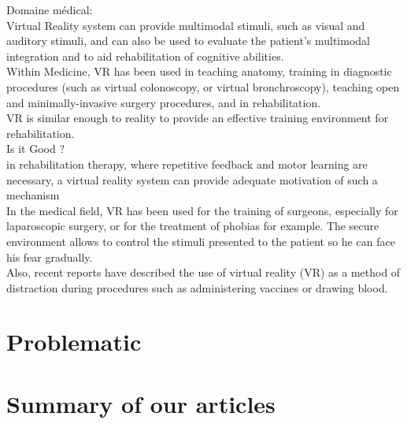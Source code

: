 \documentclass{article}
\begin{document}
Domaine médical: \\
Virtual Reality system can provide multimodal stimuli, such as visual and auditory stimuli, and can also be used to evaluate the patient’s multimodal integration and to aid rehabilitation of cognitive abilities. \\
Within Medicine, VR has been used in teaching anatomy, training in diagnostic procedures (such as virtual colonoscopy, or virtual bronchroscopy), teaching open and minimally-invasive surgery procedures, and in rehabilitation. \\

VR is similar enough to reality to provide an effective training environment for rehabilitation. \\


Is it Good ? \\
in rehabilitation therapy, where repetitive feedback and motor learning are necessary, a virtual reality system can provide adequate motivation of such a mechanism \\
In the medical field, VR has been used for the training of surgeons, especially for laparoscopic surgery, or for the treatment of phobias for example. The secure environment allows to control the stimuli presented to the patient so he can face his fear gradually. \\
Also, recent reports have described the use of virtual reality (VR) as a method of distraction during
procedures such as administering vaccines or drawing blood. \\


\section{Problematic}


\section{Summary of our articles}
\end{document}
